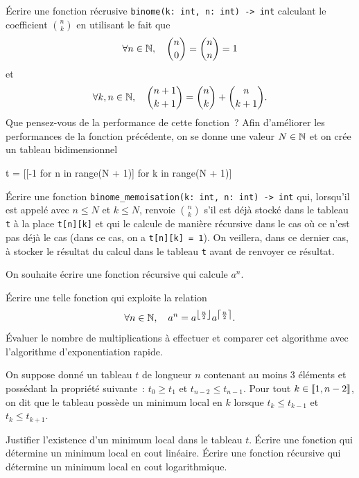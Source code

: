 \documentclass{magnolia}
\begin{document}
\begin{questions}
\question
Écrire une fonction récrusive \verb!binome(k: int, n: int) -> int!
calculant le coefficient $\binom{n}{k}$ en utilisant le fait que
\[\forall n\in\mathbb{N},\quad \binom{n}{0}=\binom{n}{n}=1\]
et
\[\forall k,n\in\mathbb{N},\quad \binom{n+1}{k+1}=\binom{n}{k}+\binom{n}{k+1}.\]
Que pensez-vous de la performance de cette fonction~?
\question Afin d'améliorer les performances de la fonction précédente, on se donne
	une valeur $N\in\mathbb{N}$ et on crée un tableau bidimensionnel 
\begin{pythoncode}
t = [[-1 for n in range(N + 1)] for k in range(N + 1)]
\end{pythoncode}
	Écrire une fonction \verb!binome_memoisation(k: int, n: int) -> int! qui,
	lorsqu'il est appelé avec $n\leq N$ et $k\leq N$, 
	renvoie $\binom{n}{k}$ s'il est déjà stocké dans le tableau \verb!t!
	à la place \verb!t[n][k]! et qui le calcule de manière récursive dans
	le cas où ce n'est pas déjà le cas (dans ce cas, on a \verb!t[n][k] = 1!).
	On veillera, dans ce dernier cas, à stocker le résultat du calcul dans
	le tableau \verb!t! avant de renvoyer ce résultat.
\end{questions}

On souhaite écrire une fonction récursive qui calcule $a^n$.
\begin{questions}
\question Écrire une telle fonction qui exploite la relation
  \[\forall n\in\mathbb{N},\quad a^n=a^{\left\lfloor\frac{n}{2}\right\rfloor} a^{\left\lceil\frac{n}{2}\right\rceil}.\]
\question Évaluer le nombre de multiplications à effectuer et comparer cet algorithme avec
  l'algorithme d'exponentiation rapide. 
\end{questions}


On suppose donné un tableau $t$ de longueur $n$ contenant au moins 3 éléments et possédant
la propriété suivante~: $t_0\geq t_1$ et $t_{n-2}\leq t_{n-1}$. Pour tout $k\in\left\llbracket 1,n-2\right\rrbracket$, on dit que le tableau possède un minimum local en $k$ lorsque $t_k\leq t_{k-1}$ et $t_k\leq t_{k+1}$.
\begin{questions}
\question Justifier l'existence d'un minimum local dans le tableau $t$.
\question Écrire une fonction qui détermine un minimum local en cout linéaire.
\question Écrire une fonction récursive qui détermine un minimum local en cout logarithmique.
\end{questions}
\end{document}
